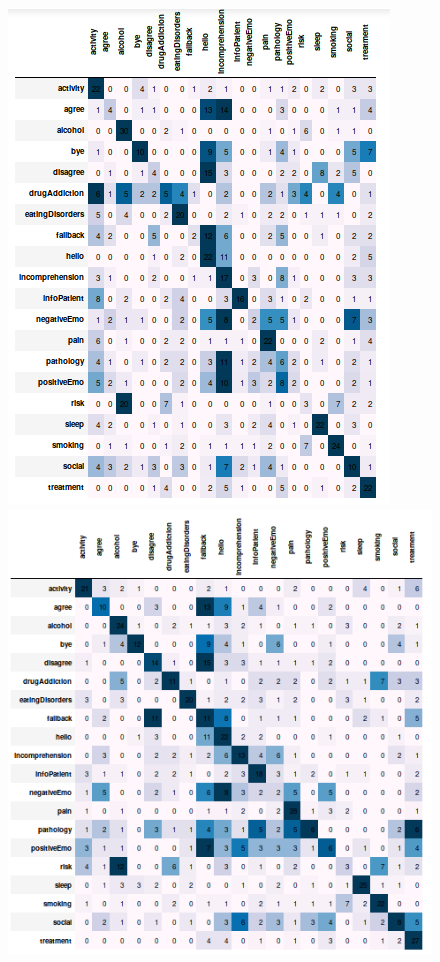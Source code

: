 \documentclass[11pt]{article}
\begin{document}
\begin{figure}[h]
	\centering
	\includegraphics[scale=0.25]{svc0_cm.png}
	\includegraphics[scale=0.25]{svc1_cm.png}

\end{figure}
\end{document}
